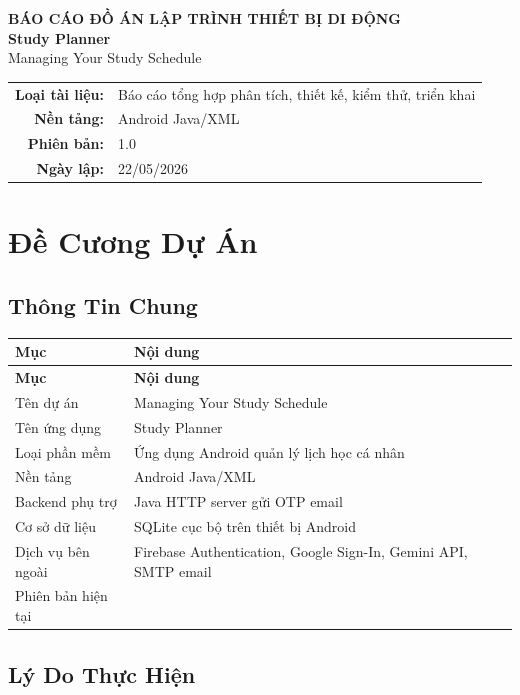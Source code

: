 \documentclass[12pt,a4paper]{report}
\begin{document}
\begin{titlepage}
\centering
{\Large \textbf{BÁO CÁO ĐỒ ÁN LẬP TRÌNH THIẾT BỊ DI ĐỘNG}\\[1.2cm]}
{\Huge \textbf{Study Planner}\\[0.4cm]}
{\Large Managing Your Study Schedule\\[1.5cm]}
\vfill
\begin{tabular}{rl}
\textbf{Loại tài liệu:} & Báo cáo tổng hợp phân tích, thiết kế, kiểm thử, triển khai \\
\textbf{Nền tảng:} & Android Java/XML \\
\textbf{Phiên bản:} & 1.0 \\
\textbf{Ngày lập:} & 22/05/2026 \\
\end{tabular}
\vfill
\end{titlepage}
\tableofcontents
\clearpage
\chapter{Đề Cương Dự Án}

\section{Thông Tin Chung}

\begin{longtable}{|>{\raggedright\arraybackslash}p{}|>{\raggedright\arraybackslash}p{}|}
\hline
\textbf{Mục} & \textbf{Nội dung} \\ \hline
\endfirsthead
\hline
\textbf{Mục} & \textbf{Nội dung} \\ \hline
\endhead
Tên dự án & Managing Your Study Schedule \\ \hline
Tên ứng dụng & Study Planner \\ \hline
Loại phần mềm & Ứng dụng Android quản lý lịch học cá nhân \\ \hline
Nền tảng & Android Java/XML \\ \hline
Backend phụ trợ & Java HTTP server gửi OTP email \\ \hline
Cơ sở dữ liệu & SQLite cục bộ trên thiết bị Android \\ \hline
Dịch vụ bên ngoài & Firebase Authentication, Google Sign-In, Gemini API, SMTP email \\ \hline
Phiên bản hiện tại & 1.0 \\ \hline
\end{longtable}

\section{Lý Do Thực Hiện}
\end{document}
